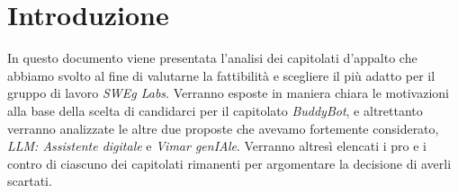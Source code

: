 \section{Introduzione}

In questo documento viene presentata l'analisi dei capitolati d'appalto che abbiamo svolto al fine di valutarne la fattibilità e scegliere il più adatto 
per il gruppo di lavoro \emph{SWEg Labs}. Verranno esposte in maniera chiara le motivazioni alla base della scelta di candidarci per il capitolato 
\emph{BuddyBot}, e altrettanto verranno analizzate le altre due proposte che avevamo fortemente considerato, \emph{LLM: Assistente digitale} e 
\emph{Vimar genIAle}. Verranno altresì elencati i pro e i contro di ciascuno dei capitolati rimanenti per argomentare la decisione di averli scartati.